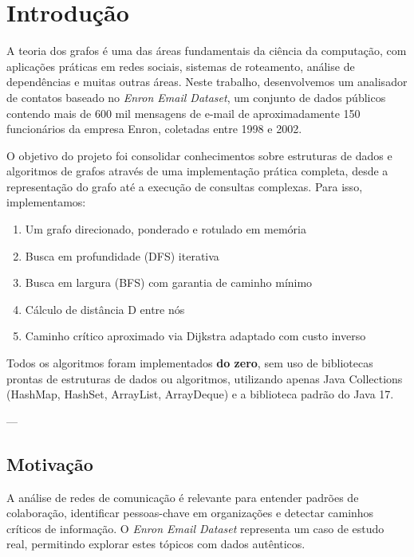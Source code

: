 \documentclass[12pt,openright,twoside,a4paper,english,brazilian,hidelinks]{abntex2}
\begin{document}

    \chapter{Introdução}

    A teoria dos grafos é uma das áreas fundamentais da ciência da computação, com aplicações
    práticas em redes sociais, sistemas de roteamento, análise de dependências e muitas outras
    áreas. Neste trabalho, desenvolvemos um analisador de contatos baseado no \textit{Enron
    Email Dataset}, um conjunto de dados públicos contendo mais de 600 mil mensagens de e-mail
    de aproximadamente 150 funcionários da empresa Enron, coletadas entre 1998 e 2002.

    O objetivo do projeto foi consolidar conhecimentos sobre estruturas de dados e algoritmos
    de grafos através de uma implementação prática completa, desde a representação do grafo até
    a execução de consultas complexas. Para isso, implementamos:

    \begin{enumerate}
        \item Um grafo direcionado, ponderado e rotulado em memória
        \item Busca em profundidade (DFS) iterativa
        \item Busca em largura (BFS) com garantia de caminho mínimo
        \item Cálculo de distância D entre nós
        \item Caminho crítico aproximado via Dijkstra adaptado com custo inverso
    \end{enumerate}

    Todos os algoritmos foram implementados \textbf{do zero}, sem uso de bibliotecas prontas
    de estruturas de dados ou algoritmos, utilizando apenas Java Collections (HashMap, HashSet,
    ArrayList, ArrayDeque) e a biblioteca padrão do Java 17.

    ---

    \section{Motivação}

    A análise de redes de comunicação é relevante para entender padrões de colaboração,
    identificar pessoas-chave em organizações e detectar caminhos críticos de informação.
    O \textit{Enron Email Dataset} representa um caso de estudo real, permitindo explorar
    estes tópicos com dados autênticos.
\end{document}
